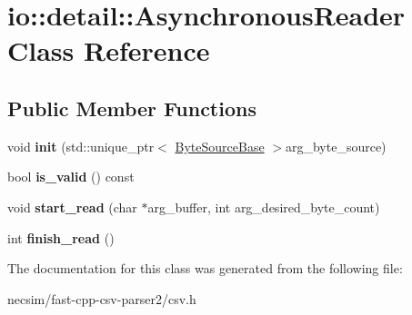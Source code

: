 \hypertarget{classio_1_1detail_1_1_asynchronous_reader}{}\section{io\+:\+:detail\+:\+:Asynchronous\+Reader Class Reference}
\label{classio_1_1detail_1_1_asynchronous_reader}
\subsection*{Public Member Functions}
\begin{DoxyCompactItemize}
\item 
void {\bfseries init} (std\+::unique\+\_\+ptr$<$ \hyperlink{classio_1_1_byte_source_base}{Byte\+Source\+Base} $>$arg\+\_\+byte\+\_\+source)\hypertarget{classio_1_1detail_1_1_asynchronous_reader_a12ed45f881a671b473d95ded7ad1474c}{}\label{classio_1_1detail_1_1_asynchronous_reader_a12ed45f881a671b473d95ded7ad1474c}

\item 
bool {\bfseries is\+\_\+valid} () const \hypertarget{classio_1_1detail_1_1_asynchronous_reader_abad9fa88bd5994f4c7a6362138737eb3}{}\label{classio_1_1detail_1_1_asynchronous_reader_abad9fa88bd5994f4c7a6362138737eb3}

\item 
void {\bfseries start\+\_\+read} (char $\ast$arg\+\_\+buffer, int arg\+\_\+desired\+\_\+byte\+\_\+count)\hypertarget{classio_1_1detail_1_1_asynchronous_reader_a9818851dbb994042d0d84183220e71c6}{}\label{classio_1_1detail_1_1_asynchronous_reader_a9818851dbb994042d0d84183220e71c6}

\item 
int {\bfseries finish\+\_\+read} ()\hypertarget{classio_1_1detail_1_1_asynchronous_reader_a94520530423e9bfeb04c23ea4e3a8786}{}\label{classio_1_1detail_1_1_asynchronous_reader_a94520530423e9bfeb04c23ea4e3a8786}

\end{DoxyCompactItemize}


The documentation for this class was generated from the following file\+:\begin{DoxyCompactItemize}
\item 
necsim/fast-\/cpp-\/csv-\/parser2/csv.\+h\end{DoxyCompactItemize}
